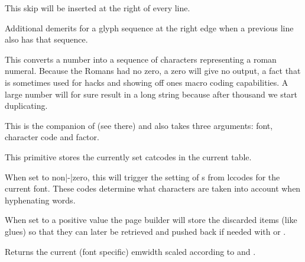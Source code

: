 \stopnewprimitive

\startoldprimitive[title={\prm {rightskip}}]

This skip will be inserted at the right of every line.

\stopoldprimitive

\startnewprimitive[title={\prm {righttwindemerits}}]

Additional demerits for a glyph sequence at the right edge when a previous line
also has that sequence.

\stopnewprimitive

\startoldprimitive[title={\prm {romannumeral}}]

This converts a number into a sequence of characters representing a roman
numeral. Because the Romans had no zero, a zero will give no output, a fact that
is sometimes used for hacks and showing off ones macro coding capabilities. A
large number will for sure result in a long string because after thousand we
start duplicating.

\stopoldprimitive

\startnewprimitive[title={\prm {rpcode}}]

This is the companion of  (see there) and also takes three
arguments: font, character code and factor.

\stopnewprimitive

\startnewprimitive[title={\prm {savecatcodetable}}]

This primitive stores the currently set catcodes in the current table.

\stopnewprimitive

\startoldprimitive[title={\prm {savinghyphcodes}}]

When set to non|-|zero, this will trigger the setting of s from \prm
{lccode}s for the current font. These codes determine what characters are taken
into account when hyphenating words.

\stopoldprimitive

\startoldprimitive[title={\prm {savingvdiscards}}]

When set to a positive value the page builder will store the discarded items
(like glues) so that they can later be retrieved and pushed back if needed with
 or .

\stopoldprimitive

\startnewprimitive[title={\prm {scaledemwidth}}]

Returns the current (font specific) emwidth scaled according to 
and .

